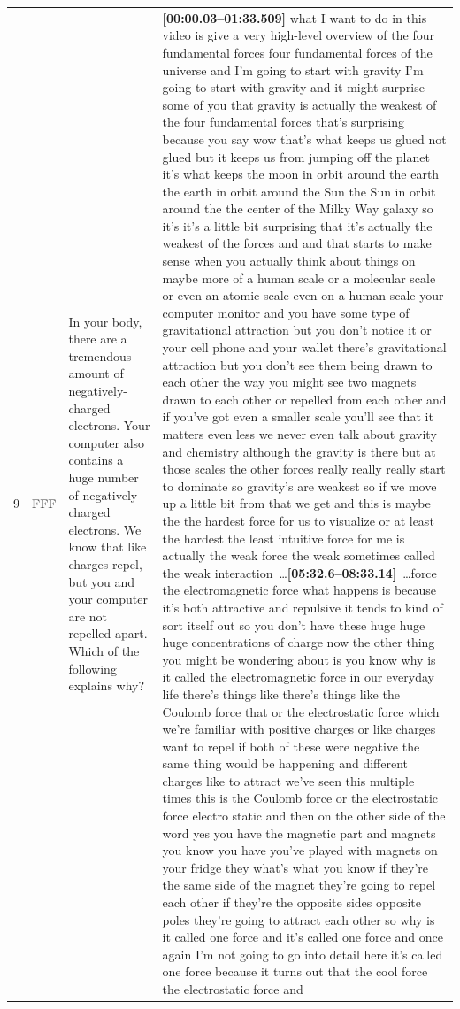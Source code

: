 \documentclass[10pt]{article}
\begin{document}
\begin{tiny}
\begin{longtable}{r p{0.3in} p{1.212in} p{3.8in}}
    9  &          FFF &  In your body, there are a tremendous amount of negatively-charged electrons. Your computer also contains a huge number of negatively-charged electrons. We know that like charges repel, but you and your computer are not repelled apart. Which of the following explains why? &  \textbf{[00:00.03--01:33.509]} what I want to do in this video is give a very high-level overview of the four fundamental forces four fundamental forces of the universe and I'm going to start with gravity I'm going to start with gravity and it might surprise some of you that gravity is actually the weakest of the four fundamental forces that's surprising because you say wow that's what keeps us glued not glued but it keeps us from jumping off the planet it's what keeps the moon in orbit around the earth the earth in orbit around the Sun the Sun in orbit around the the center of the Milky Way galaxy so it's it's a little bit surprising that it's actually the weakest of the forces and and that starts to make sense when you actually think about things on maybe more of a human scale or a molecular scale or even an atomic scale even on a human scale your computer monitor and you have some type of gravitational attraction but you don't notice it or your cell phone and your wallet there's gravitational attraction but you don't see them being drawn to each other the way you might see two magnets drawn to each other or repelled from each other and if you've got even a smaller scale you'll see that it matters even less we never even talk about gravity and chemistry although the gravity is there but at those scales the other forces really really really start to dominate so gravity's are weakest so if we move up a little bit from that we get and this is maybe the the hardest force for us to visualize or at least the hardest the least intuitive force for me is actually the weak force the weak sometimes called the weak interaction~\ldots\smallskip\newline\textbf{[05:32.6--08:33.14]}~\ldots force the electromagnetic force what happens is because it's both attractive and repulsive it tends to kind of sort itself out so you don't have these huge huge huge concentrations of charge now the other thing you might be wondering about is you know why is it called the electromagnetic force in our everyday life there's things like there's things like the Coulomb force that or the electrostatic force which we're familiar with positive charges or like charges want to repel if both of these were negative the same thing would be happening and different charges like to attract we've seen this multiple times this is the Coulomb force or the electrostatic force electro static and then on the other side of the word yes you have the magnetic part and magnets you know you have you've played with magnets on your fridge they what's what you know if they're the same side of the magnet they're going to repel each other if they're the opposite sides opposite poles they're going to attract each other so why is it called one force and it's called one force and once again I'm not going to go into detail here it's called one force because it turns out that the cool force the electrostatic force and 
\end{longtable}
\end{tiny}
\end{document}
